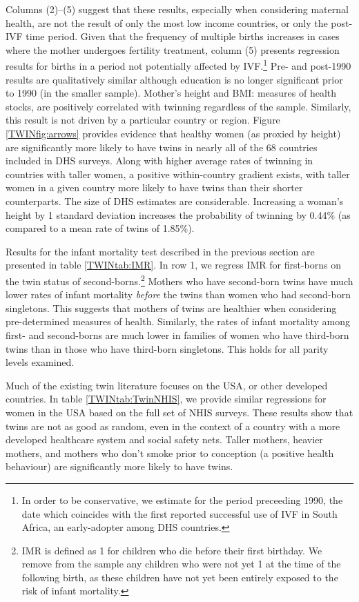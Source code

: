 \documentclass[subeqn]{article}
\begin{document}
\begin{spacing}{1.4}
Columns (2)--(5) suggest that these results, especially when considering 
maternal health, are not the result of only the most low income countries, or
only the post-IVF time period.  Given that the frequency of multiple births 
increases in cases where the mother undergoes fertility treatment, column (5) 
presents regression results for births in a period not potentially 
affected by IVF.\footnote{In order to be conservative, we estimate for the period 
preceeding 1990, the date which coincides with the first reported successful 
use of IVF in South Africa, an early-adopter among DHS countries.}  Pre- and 
post-1990 results are qualitatively similar although education is no longer 
significant prior to 1990 (in the smaller sample). Mother's height and BMI:
measures of health stocks, are positively correlated with twinning regardless
of the sample.  Similarly, this result is not driven by a particular country
or region.  Figure \ref{TWINfig:arrows} provides evidence that healthy women (as 
proxied by height) are significantly more likely to have twins in nearly all of 
the 68 countries included in DHS surveys.  Along with higher average rates of 
twinning in countries with taller women, a positive within-country gradient 
exists, with taller women in a given country more likely to have twins than their 
shorter counterparts. The size of DHS estimates are considerable. Increasing a
woman's height by 1 standard deviation increases the probability of twinning by 
0.44\% (as compared to a mean rate of twins of 1.85\%).

Results for the infant mortality test described in the previous section are
presented in table \ref{TWINtab:IMR}.  In row 1, we regress IMR for first-borns
on the twin status of second-borns.\footnote{IMR is defined as 1 for children
who die before their first birthday.  We remove from the sample any children who
were not yet 1 at the time of the following birth, as these children have not
yet been entirely exposed to the risk of infant mortality.}  Mothers who have 
second-born twins have much lower rates of infant mortality \emph{before} the 
twins than women who had second-born singletons.  This suggests that mothers of 
twins are healthier when considering pre-determined measures of health.  
Similarly, the rates of infant mortality among first- and second-borns are much 
lower in families of women who have third-born twins than in those who have 
third-born singletons.  This holds for all parity levels examined.

Much of the existing twin literature focuses on the USA, or other developed
countries. In table \ref{TWINtab:TwinNHIS}, we provide similar regressions for 
women in the USA based on the full set of NHIS surveys.  These results show
that twins are not as good as random, even in the context of a country with 
a more developed healthcare system and social safety nets. Taller mothers,
heavier mothers, and mothers who don't smoke prior to conception (a positive
health behaviour) are significantly more likely to have twins.


\end{spacing}
\end{document}
